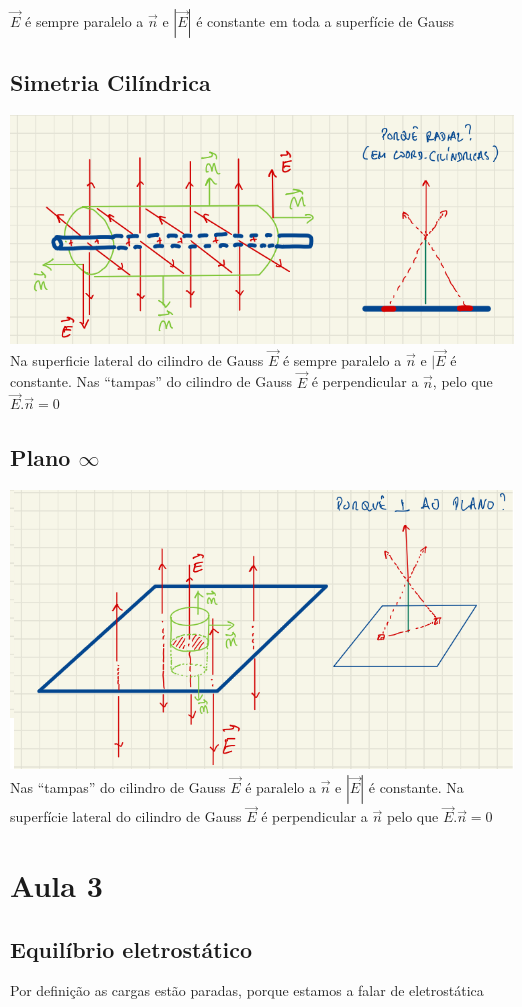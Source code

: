 \documentclass[a4paper]{article}
\begin{document}
$\vec{E}$ é sempre paralelo a $\vec{n}$ e $|\vec{E}|$ é constante em toda a superfície de Gauss
\subsection{Simetria Cilíndrica}
\includegraphics[width = \textwidth]{simetria_cilindrica.png}
Na superficie lateral do cilindro de Gauss $\vec{E}$ é sempre paralelo a $\vec{n}$ e $|\vec{E}$ é constante.
Nas ``tampas'' do cilindro de Gauss $\vec{E}$ é perpendicular a $\vec{n}$, pelo que $\vec{E}.\vec{n}=0$
\subsection{Plano \texorpdfstring{$\infty$}{Infinito}}
\includegraphics[width = \textwidth]{plano_infinito.png}
Nas ``tampas'' do cilindro de Gauss $\vec{E}$ é paralelo a $\vec{n}$ e $|\vec{E}|$ é constante.
Na superfície lateral do cilindro de Gauss $\vec{E}$ é perpendicular a $\vec{n}$ pelo que $\vec{E}.\vec{n} = 0$
\section{Aula 3}
\subsection{Equilíbrio eletrostático}
Por definição as cargas estão paradas, porque estamos a falar de eletrostática
\end{document}
